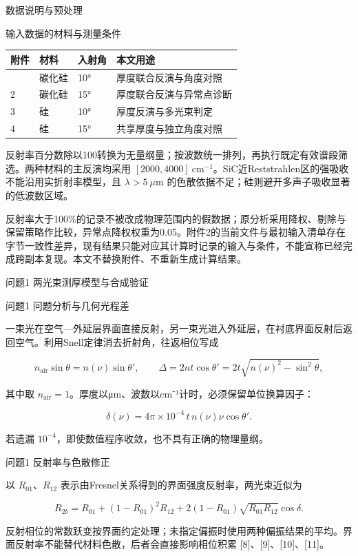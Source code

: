 数据说明与预处理

输入数据的材料与测量条件

\begin{longtable}[]{@{}llll@{}}
\toprule\noalign{}
附件 & 材料 & 入射角 & 本文用途 \\
\midrule\noalign{}
\endhead
\bottomrule\noalign{}
\endlastfoot
1 & 碳化硅 & 10° & 厚度联合反演与角度对照 \\
2 & 碳化硅 & 15° & 厚度联合反演与异常点诊断 \\
3 & 硅 & 10° & 厚度反演与多光束判定 \\
4 & 硅 & 15° & 共享厚度与独立角度对照 \\
\end{longtable}

反射率百分数除以100转换为无量纲量；按波数统一排列，再执行既定有效谱段筛选。两种材料的主反演均采用
\([2000,4000]\ \mathrm{cm}^{-1}\)。SiC近Reststrahlen区的强吸收不能沿用实折射率模型，且
\(\lambda>5\ \mu\mathrm m\)
的色散依据不足；硅则避开多声子吸收显著的低波数区域。

反射率大于100\%的记录不被改成物理范围内的假数据；原分析采用降权、剔除与保留策略作比较，异常点降权权重为0.05。附件2的当前文件与最初输入清单存在字节一致性差异，现有结果只能对应其计算时记录的输入与条件，不能宣称已经完成跨副本复现。本文不替换附件、不重新生成计算结果。

问题1 两光束测厚模型与合成验证

问题1 问题分析与几何光程差

一束光在空气---外延层界面直接反射，另一束光进入外延层，在衬底界面反射后返回空气。利用Snell定律消去折射角，往返相位写成

\[n_{\mathrm{air}}\sin\theta=n(\nu)\sin\theta',\qquad
\Delta=2nt\cos\theta'=2t\sqrt{n(\nu)^2-\sin^2\theta},\]

其中取
\(n_{\mathrm{air}}=1\)。厚度以μm、波数以cm⁻¹计时，必须保留单位换算因子：

\[\delta(\nu)=4\pi\times10^{-4}\,t\,n(\nu)\nu\cos\theta'. \]

若遗漏 \(10^{-4}\)，即使数值程序收敛，也不具有正确的物理量纲。

问题1 反射率与色散修正

以 \(R_{01}\)、\(R_{12}\)
表示由Fresnel关系得到的界面强度反射率，两光束近似为

\[R_{2b}=R_{01}+(1-R_{01})^2R_{12}
+2(1-R_{01})\sqrt{R_{01}R_{12}}\cos\delta.\]

反射相位的常数跃变按界面约定处理；未指定偏振时使用两种偏振结果的平均。界面反射率不能替代材料色散，后者会直接影响相位积累
{[}8{]}、{[}9{]}、{[}10{]}、{[}11{]}。

